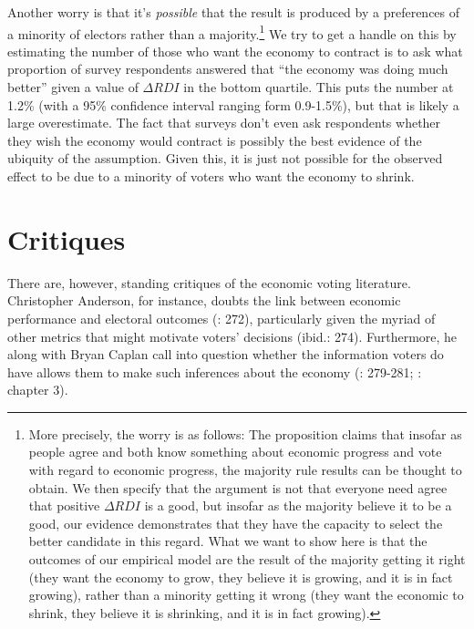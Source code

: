 \documentclass[11pt]{article}
\begin{document}
Another worry is that it's \emph{possible} that the result is produced by a preferences of a minority of electors rather than a majority.\footnote{More precisely, the worry is as follows: The proposition claims that insofar as people agree and both know something about economic progress and vote with regard to economic progress, the majority rule results can be thought to obtain. We then specify that the argument is not that everyone need agree that positive $\Delta RDI$ is a good, but insofar as the majority believe it to be a good, our evidence demonstrates that they have the capacity to select the better candidate in this regard. What we want to show here is that the outcomes of our empirical model are the result of the majority getting it right (they want the economy to grow,  they believe it is growing, and it is in fact growing), rather than a minority getting it wrong (they want the economic to shrink, they believe it is shrinking, and it is in fact growing).} We try to get a handle on this by estimating the number of those who want the economy to contract is to ask what proportion of survey respondents answered  that ``the economy was doing much better'' given a value of $\Delta RDI$ in the bottom quartile. This puts the number at 1.2\% (with a 95\% confidence interval ranging form 0.9-1.5\%), but that is likely a large overestimate. %
The fact that surveys don't even ask respondents whether they wish the economy would contract is possibly the best evidence of the ubiquity of the assumption. Given this, it is just not possible for the observed effect to be due to a minority of voters who want the economy to shrink. 


\section{Critiques}

There are, however, standing critiques of the economic voting literature.  Christopher Anderson, for instance, doubts the link between economic performance and electoral outcomes (\cite{Anderson07}: 272), particularly given the myriad of other metrics that might motivate voters' decisions (ibid.: 274). Furthermore, he along with Bryan Caplan call into question whether the information voters do have allows them to make such inferences about the economy (\cite{Anderson07}: 279-281; \cite{Caplan2006}: chapter 3).
\end{document}
